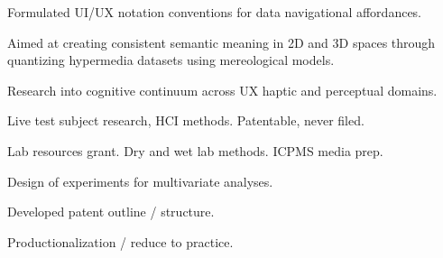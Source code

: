 \documentclass[letterpaper]{deedy-resume} %
\begin{document}
\begin{minipage}[t]{0.66\textwidth}
\sectionspace %



\begin{tightitemize}
\item Formulated UI/UX notation conventions for data navigational affordances.
\item Aimed at creating consistent semantic meaning in 2D and 3D spaces through quantizing hypermedia datasets using mereological models.
\item Research into cognitive continuum across UX haptic and perceptual domains.
\item Live test subject research, HCI methods.  Patentable, never filed.
\end{tightitemize}

\sectionspace %



\begin{tightitemize}
\item Lab resources grant. Dry and wet lab methods. ICPMS media prep.
\item Design of experiments for multivariate analyses.
\item Developed patent outline / structure.
\item Productionalization / reduce to practice. 
\end{tightitemize}

\sectionspace %




\end{minipage} %

\end{document}
